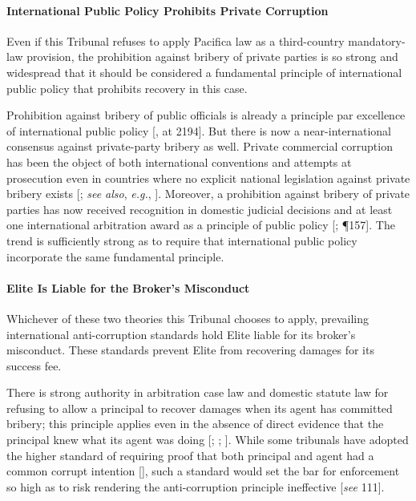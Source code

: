 \paragraph{International Public Policy Prohibits Private Corruption}

Even if this Tribunal refuses to apply Pacifica law as a third-country mandatory-law provision, the prohibition against bribery of private parties is so strong and widespread that it should be considered a fundamental principle of international public policy that prohibits recovery in this case.

Prohibition against bribery of public officials is already a principle par excellence of international public policy [\cite{Born 2009}, at 2194].  But there is now a near-international consensus against private-party bribery as well.  Private commercial corruption has been the object of both international conventions and attempts at prosecution even in countries where no explicit national legislation against private bribery exists [\seeeg \cite{CoE Corruption Convention}; \textit{see also}, \textit{e.g.}, \cite{Ansley et al.}].  Moreover, a prohibition against bribery of private parties has now received recognition in domestic judicial decisions and at least one international arbitration award as a principle of public policy [\seeeg \cite{Corner House Research}; \cite{World Duty Free Case} \P 157].  The trend is sufficiently strong as to require that international public policy incorporate the same fundamental principle.

\paragraph{Elite Is Liable for the Broker's Misconduct}

Whichever of these two theories this Tribunal chooses to apply, prevailing international anti-corruption standards hold Elite liable for its broker's misconduct.  These standards prevent Elite from recovering damages for its success fee.

There is strong authority in arbitration case law and domestic statute law for refusing to allow a principal to recover damages when its agent has committed bribery; this principle applies even in the absence of direct evidence that the principal knew what its agent was doing [\seeeg \cite{Bribery Act}; \cite{ICC Case No. 1110}; \cite{ICC Case No. 6248}].  While some tribunals have adopted the higher standard of requiring proof that both principal and agent had a common corrupt intention [\seeeg \cite{Westacre Case}], such a standard would set the bar for enforcement so high as to risk rendering the anti-corruption principle ineffective [\textit{see} \cite{Sayed} 111].

